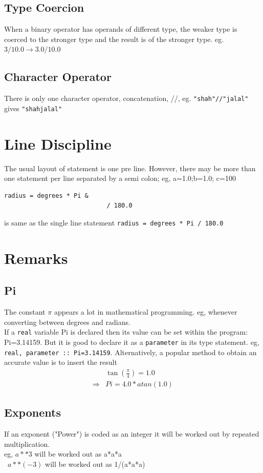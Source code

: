 \documentclass[12pt,oneside]{book}
\newcommand{\code}[1]{\lstinline[keywordstyle=\color{black},basicstyle=\ttfamily]{#1}}
\begin{document}
    \subsection{Type Coercion}
    When a binary operator has operands of different type, the weaker type is coerced to the stronger type and the result is of the stronger type. eg. $ 3/10.0 \to 3.0/10.0 $
    \subsection{Character Operator}
    There is only one character operator, concatenation, //, eg. \code{"shah"//"jalal"} gives \code{"shahjalal"}
    \section{Line Discipline} 
    The usual layout of statement is one pre line. However, there may be more than one statement per line separated by a semi colon; eg, a=1.0;b=1.0; c=100\\
    \begin{lstlisting}[numbers=none]
        radius = degrees * Pi &
                            / 180.0
    \end{lstlisting}
    is same as the single line statement \code{radius = degrees * Pi / 180.0}
    \section{Remarks}
    \subsection{Pi}
    The constant $ \pi $ appears a lot in mathematical programming. eg, whenever converting between degrees and radians.\\
    If a \code{real} variable Pi is declared then its value can be set within the program: Pi=3.14159. But it is good to declare it as a \code{parameter} in its type statement. eg, \code{real, parameter :: Pi=3.14159}. Alternatively, a popular method to obtain an accurate value is to insert the result
    \begin{align*}
        & \tan(\frac{\pi}{4})=1.0 \\
        \Rightarrow & Pi=4.0* atan(1.0)
    \end{align*}
    \subsection{Exponents} 
    If an exponent ("Power") is coded as an integer it will be worked out by repeated multiplication.\\eg,
    $ a**3 $ will be worked out as a*a*a\\
    $ \,\,\,  a**(-3)$ will be worked out as 1/(a*a*a)\\
\end{document}
